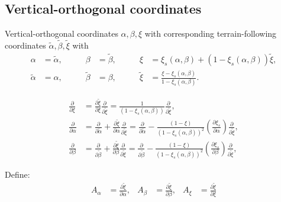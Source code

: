 \documentclass{article}
\newcommand{\pdiff}[2]{\frac{\partial #1}{\partial #2}}
\begin{document}
\subsection{Vertical-orthogonal coordinates}

Vertical-orthogonal coordinates $\alpha, \beta, \xi$ with corresponding terrain-following coordinates $\tilde{\alpha}, \tilde{\beta}, \tilde{\xi}$ with
\begin{align}
\alpha &= \tilde{\alpha}, &\qquad \beta &= \tilde{\beta}, &\qquad \xi &= \xi_s(\alpha, \beta) + (1 - \xi_s(\alpha,\beta)) \tilde{\xi}, \\
\tilde{\alpha} &= \alpha, &\qquad \tilde{\beta} &= \beta, &\qquad \tilde{\xi} &= \frac{\xi - \xi_s(\alpha, \beta)}{1 - \xi_s(\alpha, \beta)}.
\end{align}

\begin{align}
\pdiff{}{\xi} &= \pdiff{\tilde{\xi}}{\xi} \pdiff{}{\tilde{\xi}} = \frac{1}{(1 - \xi_s(\alpha,\beta))} \pdiff{}{\tilde{\xi}}, \\
\pdiff{}{\alpha} &= \pdiff{}{\tilde{\alpha}} + \pdiff{\tilde{\xi}}{\alpha} \pdiff{}{\tilde{\xi}} = \pdiff{}{\tilde{\alpha}} - \frac{(1 - \xi)}{(1 - \xi_s(\alpha, \beta))^2} \left( \pdiff{\xi_s}{\alpha} \right) \pdiff{}{\tilde{\xi}}, \\
\pdiff{}{\beta} &= \pdiff{}{\tilde{\beta}} + \pdiff{\tilde{\xi}}{\beta} \pdiff{}{\tilde{\xi}} = \pdiff{}{\tilde{\beta}} - \frac{(1 - \xi)}{(1 - \xi_s(\alpha, \beta))^2} \left( \pdiff{\xi_s}{\beta} \right) \pdiff{}{\tilde{\xi}},
\end{align}

Define:
\begin{align}
A_\alpha &= \pdiff{\tilde{\xi}}{\alpha}, & A_\beta &= \pdiff{\tilde{\xi}}{\beta}, & A_\xi &= \pdiff{\tilde{\xi}}{\xi}
\end{align}
\end{document}
